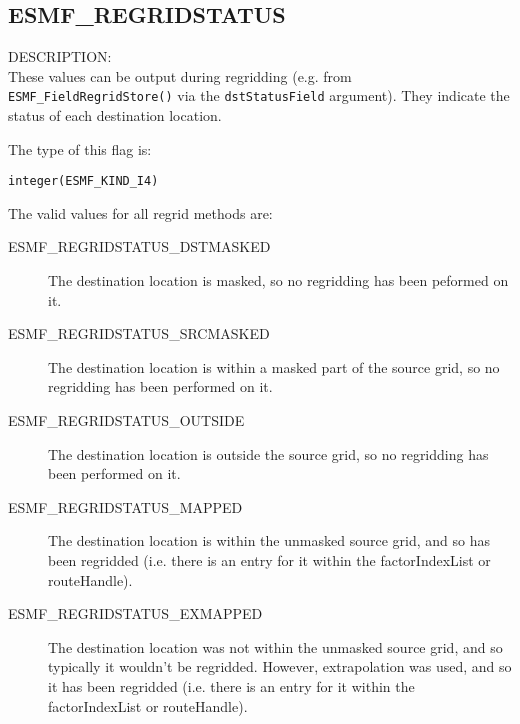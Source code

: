 \subsection{ESMF\_REGRIDSTATUS}
\label{opt:regridstatus}

{\sf DESCRIPTION:\\}  
 These values can be output during regridding (e.g. from {\tt ESMF\_FieldRegridStore()} via the {\tt dstStatusField} argument). They indicate the status of each destination location.

The type of this flag is:

{\tt integer(ESMF\_KIND\_I4)}

The valid values for all regrid methods are:
\begin{description}
\item [ESMF\_REGRIDSTATUS\_DSTMASKED] The destination location is masked, so no regridding has been peformed on it. 
\item [ESMF\_REGRIDSTATUS\_SRCMASKED] The destination location is within a masked part of the source grid, so no regridding has been performed on it. 
\item [ESMF\_REGRIDSTATUS\_OUTSIDE] The destination location is outside the source grid, so no regridding has been performed on it. 
\item [ESMF\_REGRIDSTATUS\_MAPPED] The destination location is within the unmasked source grid, and so has been regridded (i.e. there is an entry for it within the factorIndexList or routeHandle). 
\item [ESMF\_REGRIDSTATUS\_EXMAPPED] The destination location was not within the unmasked source grid, and so typically it wouldn't be regridded. However, extrapolation was used, and so it has been regridded (i.e. there is an entry for it within the factorIndexList or routeHandle). 
\end{description}

